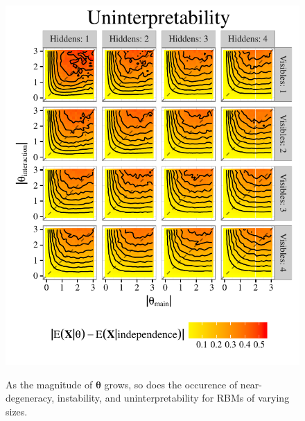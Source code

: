 \documentclass[extrafontsizes, 30pt]{memoir}
\begin{document}
\begin{textblock}{14}
\begin{figure}
\includegraphics{images/uninterpretability.pdf}
\label{fig:three_ways}
\caption{As the magnitude of $\boldsymbol \theta$ grows, so does the occurence of near-degeneracy, instability, and uninterpretability for RBMs of varying sizes.}
\end{figure}
\end{textblock}
\end{document}
